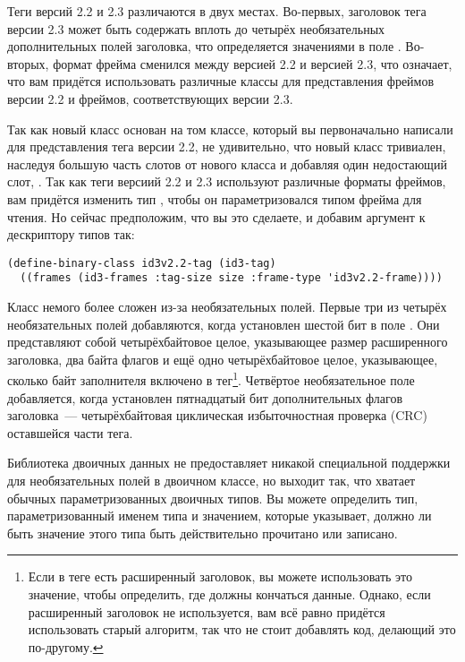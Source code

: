 Теги версий 2.2 и 2.3 различаются в двух местах. Во-первых, заголовок тега версии 2.3
может быть содержать вплоть до четырёх необязательных дополнительных полей заголовка, что
определяется значениями в поле . Во-вторых, формат фрейма сменился между
версией 2.2 и версией 2.3, что означает, что вам придётся использовать различные классы
для представления фреймов версии 2.2 и фреймов, соответствующих версии 2.3.

Так как новый класс  основан на том классе, который вы первоначально
написали для представления тега версии 2.2, не удивительно, что новый класс
 тривиален, наследуя большую часть слотов от нового класса
 и добавляя один недостающий слот, . Так как теги версиий 2.2 и
2.3 используют различные форматы фреймов, вам придётся изменить тип ,
чтобы он параметризовался типом фрейма для чтения. Но сейчас предположим, что вы это
сделаете, и добавим аргумент  к дескриптору типов  так:

\begin{lstlisting}
(define-binary-class id3v2.2-tag (id3-tag)
  ((frames (id3-frames :tag-size size :frame-type 'id3v2.2-frame))))
\end{lstlisting}

Класс  немого более сложен из-за необязательных полей. Первые три из
четырёх необязательных полей добавляются, когда установлен шестой бит в поле
. Они представляют собой четырёхбайтовое целое, указывающее размер
расширенного заголовка, два байта флагов и ещё одно четырёхбайтовое целое, указывающее,
сколько байт заполнителя включено в тег\footnote{Если в теге есть расширенный заголовок,
  вы можете использовать это значение, чтобы определить, где должны кончаться
  данные. Однако, если расширенный заголовок не используется, вам всё равно придётся
  использовать старый алгоритм, так что не стоит добавлять код, делающий это
  по-другому.}. Четвёртое необязательное поле добавляется, когда установлен пятнадцатый
бит дополнительных флагов заголовка~--- четырёхбайтовая циклическая избыточностная проверка
(CRC) оставшейся части тега.

Библиотека двоичных данных не предоставляет никакой специальной поддержки для
необязательных полей в двоичном классе, но выходит так, что хватает обычных
параметризованных двоичных типов. Вы можете определить тип, параметризованный именем типа
и значением, которые указывает, должно ли быть значение этого типа быть действительно
прочитано или записано.

